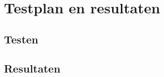 \chapter{Testplan en resultaten} %
\label{cha:testplan_en_resultaten}

\section{Testen} %
\label{sec:testen}


\section{Resultaten} %
\label{sec:resultaten}


\clearpage